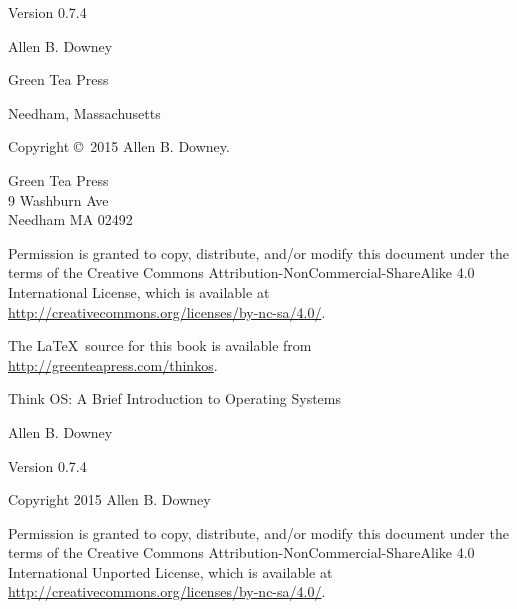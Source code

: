 \documentclass[12pt]{book}
\newcommand{\thetitle}{Think OS}
\newcommand{\thesubtitle}{A Brief Introduction to Operating Systems}
\newcommand{\theversion}{0.7.4}
\begin{document}
\begin{latexonly}
\begin{flushright}
Version \theversion

\vspace{1in}


{\Large
Allen B. Downey\\
}


\vspace{0.5in}

{\Large Green Tea Press}

{\small Needham, Massachusetts}

\vfill

\end{flushright}


\pagebreak
\thispagestyle{empty}

Copyright \copyright ~2015 Allen B. Downey.


\vspace{0.2in}

\begin{flushleft}
Green Tea Press       \\
9 Washburn Ave \\
Needham MA 02492
\end{flushleft}

Permission is granted to copy, distribute, and/or modify this document
under the terms of the Creative Commons
Attribution-NonCommercial-ShareAlike 4.0 International License, which
is available at
\url{http://creativecommons.org/licenses/by-nc-sa/4.0/}.


The \LaTeX\ source for this book is available from
\url{http://greenteapress.com/thinkos}.

\vspace{0.2in}

\end{latexonly}



\begin{htmlonly}


{\Large \thetitle: \thesubtitle}

{\large Allen B. Downey}

Version \theversion

\vspace{0.25in}

Copyright 2015 Allen B. Downey

\vspace{0.25in}

Permission is granted to copy, distribute, and/or modify this document
under the terms of the Creative Commons 
Attribution-NonCommercial-ShareAlike 4.0 International
Unported License, which is available at
\url{http://creativecommons.org/licenses/by-nc-sa/4.0/}.

\setcounter{chapter}{-1}

\end{htmlonly}
\end{document}
